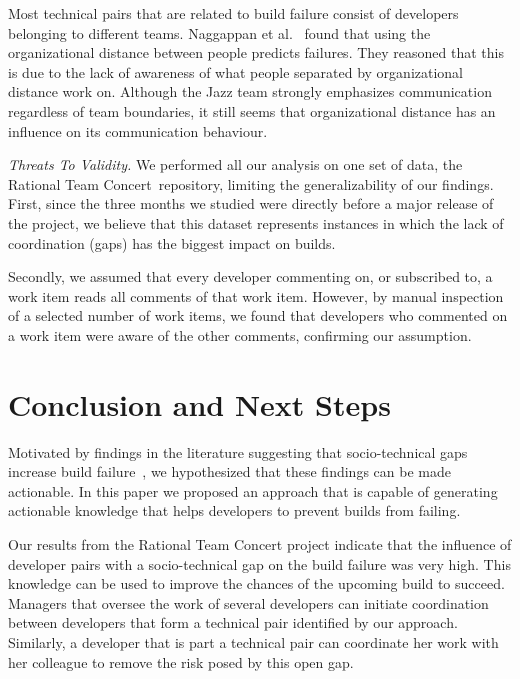 \documentclass[conference]{IEEEtran}
\begin{document}

Most technical pairs that are related to build failure consist of developers belonging to
different teams. Naggappan et al.~\cite{nagappan:icse:2008} found that using the
organizational distance between people predicts failures. They reasoned that this
is due to the lack of awareness of what people separated by organizational distance
work on. Although the Jazz team strongly emphasizes communication
regardless of team boundaries, it still seems that organizational distance has
an influence on its communication behaviour.

\emph{Threats To Validity.}
\label{sec:threats}
We performed all our analysis on one set of data, the Rational Team Concert\texttrademark\
repository, limiting the generalizability of our findings.
First, since the three months  we studied were directly before a major release of the project, 
we believe that this dataset represents instances in which the lack of coordination (gaps) has the biggest impact on builds.

Secondly, we assumed that every developer commenting on, or subscribed to, a work item reads all comments of that work item. 
However, by manual inspection of a selected number of work items, we found that developers who commented on a work item were aware of the other comments, confirming our assumption.



\section{Conclusion and Next Steps}
Motivated by findings in the literature suggesting that socio-technical gaps increase build failure~\cite{kwan:tse:2011},
we hypothesized that these findings can be made actionable.
In this paper we proposed an approach that is capable of generating actionable knowledge that helps developers to prevent builds from failing.

Our results from the Rational Team Concert project indicate that 
the influence of developer pairs with a socio-technical gap on the build
failure was very high.
This knowledge can be used to improve the chances of the upcoming build to succeed.
Managers that oversee the work of several developers can initiate coordination between developers that form a technical pair identified by our approach.
Similarly, a developer that is part a technical pair can coordinate her work with her colleague to remove the risk posed by this open gap.
\end{document}
